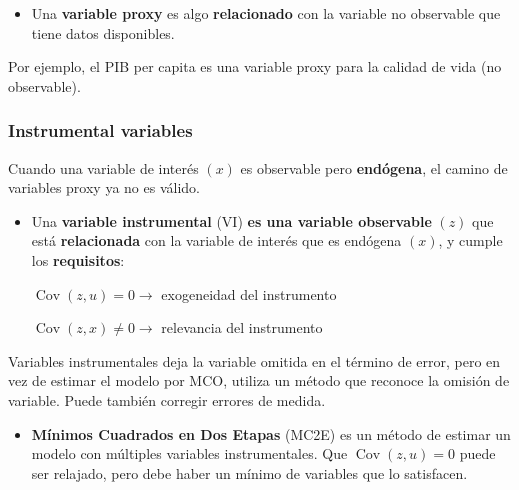 \documentclass[10pt, a4paper, landscape]{article}
\DeclareMathOperator{\Cov}{Cov}
\begin{document}
\begin{multicols}{3}
\begin{itemize}[leftmargin=*]
	\item Una \textbf{variable proxy} es algo \textbf{relacionado} con la variable no observable que tiene datos disponibles.
\end{itemize}

Por ejemplo, el PIB per capita es una variable proxy para la calidad de vida (no observable).

\subsubsection*{Instrumental variables}

Cuando una variable de interés \( (x) \) es observable pero \textbf{endógena}, el camino de variables proxy ya no es válido.

\begin{itemize}[leftmargin=*]
	\item Una \textbf{variable instrumental} (VI) \textbf{es una variable observable} \( (z) \) que está \textbf{relacionada} con la variable de interés que es endógena \( (x) \), y cumple los \textbf{requisitos}:
	\begin{center}
		\( \Cov(z, u) = 0 \rightarrow \) exogeneidad del instrumento

		\( \Cov(z, x) \neq 0 \rightarrow \) relevancia del instrumento
	\end{center}
\end{itemize}

Variables instrumentales deja la variable omitida en el término de error, pero en vez de estimar el modelo por MCO, utiliza un método que reconoce la omisión de variable. Puede también corregir errores de medida.

\begin{itemize}[leftmargin=*]
	\item \textbf{Mínimos Cuadrados en Dos Etapas} (MC2E) es un método de estimar un modelo con múltiples variables instrumentales. Que \( \Cov(z, u) = 0 \) puede ser relajado, pero debe haber un mínimo de variables que lo satisfacen.


\end{itemize}
\end{multicols}
\end{document}
